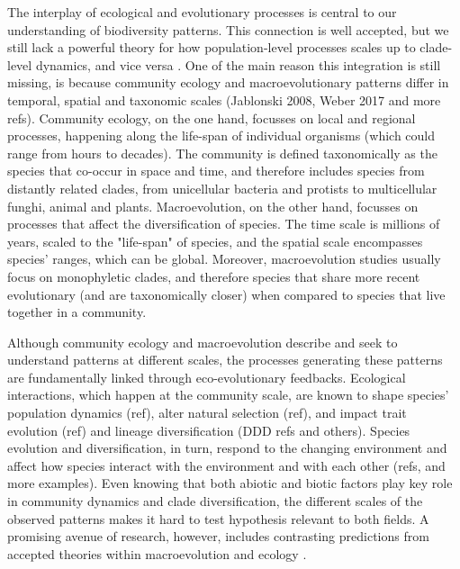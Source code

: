 \documentclass[a4paper]{article}
\begin{document}
The interplay of ecological and evolutionary processes is central to our understanding of biodiversity patterns.
This connection is well accepted, but we still lack a powerful theory for how population-level processes scales up to clade-level dynamics, and vice versa \citep{jablonski2008biotic, weber2017evolution}.
One of the main reason this integration is still missing, is because community ecology and macroevolutionary patterns differ in temporal, spatial and taxonomic scales (Jablonski 2008, Weber 2017 and more refs). 
Community ecology, on the one hand, focusses on local and regional processes, happening along the life-span of individual organisms (which could range from hours to decades). The community is defined taxonomically as the species that co-occur in space and time, and therefore includes species from distantly related clades, from unicellular bacteria and protists to multicellular funghi, animal and plants. 
Macroevolution, on the other hand, focusses on processes that affect the diversification of species. The time scale is millions of years, scaled to the "life-span" of species, and the spatial scale encompasses species' ranges, which can be global. Moreover, macroevolution studies usually focus on monophyletic clades, and therefore species that share more recent evolutionary (and are taxonomically closer) when compared to species that live together in a community. 




Although community ecology and macroevolution describe and seek to understand patterns at different scales, the processes generating these patterns are fundamentally linked through eco-evolutionary feedbacks. %
Ecological interactions, which happen at the community scale, are known to shape species’ population dynamics (ref), alter natural selection (ref), and impact trait evolution (ref) and lineage diversification (DDD refs and others). %
Species evolution and diversification, in turn, respond to the changing environment and affect how species interact with the environment and with each other (refs, and more examples). %
Even knowing that both abiotic and biotic factors play key role in community dynamics and clade diversification, the different scales of the observed patterns makes it hard to test hypothesis relevant to both fields.
A promising avenue of research, however, includes contrasting predictions from accepted theories within macroevolution and ecology \citep{voje2015role}.
\end{document}

